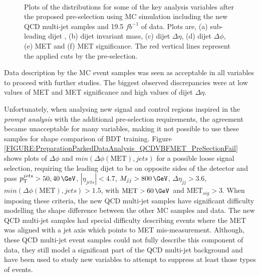 \begin{figure}[!htb]
 \\
\caption[Plots of the distributions for some of the key analysis variables after the proposed pre-selection using MC simulation including the new QCD multi-jet samples and 19.5 $fb^{-1}$ of data.]
{Plots of the distributions for some of the key analysis variables after the proposed pre-selection using \gls{MC} simulation including the new \gls{QCD} multi-jet samples and 19.5 $fb^{-1}$ of data. Plots are, (a) sub-leading dijet \pt, (b) dijet invariant mass, (c) dijet $\Delta\eta$, (d) dijet $\Delta\phi$, (e) \gls{MET} and (f) \gls{MET} significance. The red vertical lines represent the applied cuts by the pre-selection.}
\label{FIGURE:PreparationParkedDataAnalysis_QCDVBFMET_PreSectionVariables}
\end{figure}

Data description by the \gls{MC} event samples was seen as acceptable in all variables to proceed with further studies. The biggest observed discrepancies were at low values of \gls{MET} and \gls{MET} significance and high values of dijet $\Delta\eta$.

Unfortunately, when analysing new signal and control regions inspired in the \textit{prompt analysis} with the additional pre-selection requirements, the agreement became unacceptable for many variables, making it not possible to use these samples for shape comparison of \gls{BDT} training. Figure \ref{FIGURE:PreparationParkedDataAnalysis_QCDVBFMET_PreSectionFail} shows plots of $\Delta\phi$ and $min(\Delta\phi(\text{MET}),jets)$ for a possible loose signal selection, requiring the leading dijet to be on opposite sides of the detector and pass $\pt^{jets}>50,40\,\GeV$, $|\eta_{jets}|<4.7$, $M_{jj}>800\,\GeV$, $\Delta\eta_{jj}>3.6$, $min(\Delta\phi(\text{MET}),jets)>1.5$, with $\text{MET}>60\,\GeV$ and $\text{MET}_{sig}>3$. When imposing these criteria, the new \gls{QCD} multi-jet samples have significant difficulty modelling the shape difference between the other \gls{MC} samples and data. The new \gls{QCD} multi-jet samples had special difficulty describing events where the \gls{MET} was aligned with a jet axis which points to \gls{MET} mis-measurement. Although, these \gls{QCD} multi-jet event samples could not fully describe this component of data, they still model a significant part of the \gls{QCD} multi-jet background and have been used to study new variables to attempt to suppress at least those types of events. 

